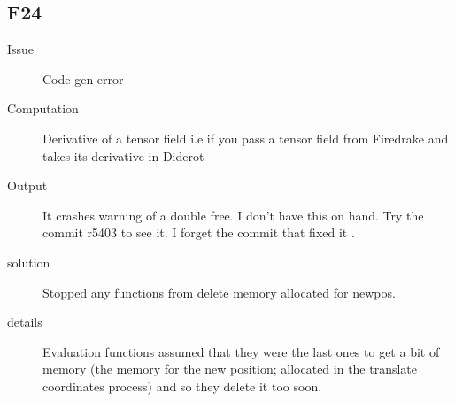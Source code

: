 \subsection{F24}
\begin{description}
\item[Issue] Code gen error
\item[Computation] Derivative of a tensor field i.e if you pass a tensor field from Firedrake and takes its derivative in Diderot
\item[Output]  It crashes warning of a double free. I don't have this on hand. Try the commit r5403 to see it. I forget the commit that fixed it
.\item[solution] Stopped any functions from delete memory allocated for newpos.
\item[details] Evaluation functions assumed that they were the last ones to get a bit of memory (the memory for the new position; allocated in the translate coordinates process) and so they delete it too soon.

\end{description}